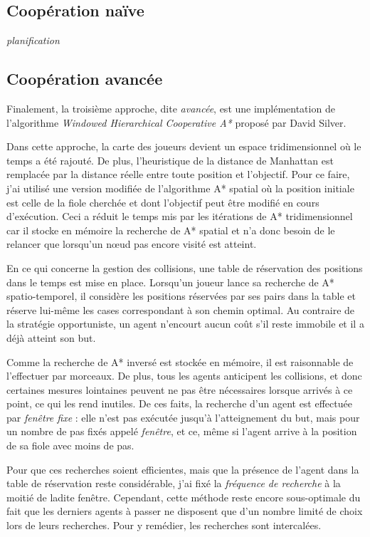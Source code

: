 \documentclass[letterpaper]{article}
\begin{document}
\subsection{Coop\'eration na\"ive}
\textit{planification}

\subsection{Coop\'eration avanc\'ee}
Finalement, la troisi\`eme approche, dite \textit{avanc\'ee}, est une impl\'ementation de l'algorithme \textit{Windowed Hierarchical Cooperative A*} propos\'e par David Silver. %

Dans cette approche, la carte des joueurs devient un espace tridimensionnel o\`u le temps a \'et\'e rajout\'e.
De plus, l'heuristique de la distance de Manhattan est remplac\'ee par la distance r\'eelle entre toute position et l'objectif.
Pour ce faire, j'ai utilis\'e une version modifi\'ee de l'algorithme A* spatial o\`u la position initiale est celle de la fiole cherch\'ee et dont l'objectif peut \^etre modifi\'e en cours d'ex\'ecution.
Ceci a r\'eduit le temps mis par les it\'erations de A* tridimensionnel car il stocke en m\'emoire la recherche de A* spatial et n'a donc besoin de le relancer que lorsqu'un n\oe ud pas encore visit\'e est atteint.

En ce qui concerne la gestion des collisions, une table de r\'eservation des positions  dans le temps est mise en place.
Lorsqu'un joueur lance sa recherche de A* spatio-temporel, il consid\`ere les positions r\'eserv\'ees par ses pairs dans la table et r\'eserve lui-m\^eme les cases correspondant \`a son chemin optimal.
Au contraire de la strat\'egie opportuniste, un agent n'encourt aucun co\^ut s'il reste immobile et il a d\'ej\`a atteint son but.

Comme la recherche de A* invers\'e est stock\'ee en m\'emoire, il est raisonnable de l'effectuer par morceaux.
De plus, tous les agents anticipent les collisions, et donc certaines mesures lointaines peuvent ne pas \^etre n\'ecessaires lorsque arriv\'es \`a ce point, ce qui les rend inutiles.
De ces faits, la recherche d'un agent est effectu\'ee par \textit{fen\^etre fixe} : elle n'est pas ex\'ecut\'ee jusqu'\`a l'atteignement du but, mais pour un nombre de pas fix\'es appel\'e \textit{fen\^etre}, et ce, m\^eme si l'agent arrive \`a la position de sa fiole avec moins de pas.

Pour que ces recherches soient efficientes, mais que la pr\'esence de l'agent dans la table de r\'eservation reste consid\'erable, j'ai fix\'e la \textit{fr\'equence de recherche} \`a la moiti\'e de ladite fen\^etre.
Cependant, cette m\'ethode reste encore sous-optimale du fait que les derniers agents \`a passer ne disposent que d'un nombre limit\'e de choix lors de leurs recherches.
Pour y rem\'edier, les recherches sont intercal\'ees. 
\end{document}
